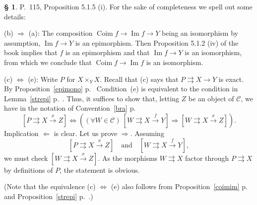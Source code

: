 \documentclass[12pt]{article}%
\theoremstyle{remark}
\theoremstyle{definition}
\newtheorem{s}[thm]{\S}%
\newcommand{\nn}{\noindent}
\newcommand{\C}{\mathcal C}
\newcommand{\parar}{\rightrightarrows}
\newcommand{\si}{\Leftarrow}
\newcommand{\ssi}{\Leftrightarrow}%
\newcommand{\then}{\Rightarrow}
\newcommand{\xr}{\xrightarrow}
\DeclareMathOperator{\Coim}{Coim}
\DeclareMathOperator{\Ima}{Im}
\begin{document}
\begin{s}\label{515i}
P.~115, Proposition 5.1.5 (i). For the sake of completeness we spell out some details:

\nn(b) $\then$ (a): The composition $\Coim f\to\Ima f\to Y$ being an isomorphism by assumption, $\Ima f\to Y$ is an epimorphism. Then Proposition 5.1.2 (iv) of the book implies that $f$ is an epimorphism and that $\Ima f\to Y$ is an isomorphism, from which we conclude that $\Coim f\to\Ima f$ is an isomorphism.

\nn(c) $\ssi$ (e): Write $P$ for $X\times_YX$. Recall that (c) says that $P\parar X\to Y$ is exact. By Proposition~\ref{epimono} p.~\pageref{epimono} Condition~(e) is equivalent to the condition in Lemma~\ref{strepi} p.~\pageref{strepi}. Thus, it suffices to show that, letting $Z$ be an object of $\C$, we have in the notation of Convention~\ref{bra} p.~\pageref{bra} 
$$
[P\parar X\xr xZ]\iff((\forall W\in\C)\ [W\parar X\xr fY]\then[W\parar X\xr xZ]).
$$ 
Implication $\si$ is clear. Let us prove $\then$. Assuming 
$$
[P\parar X\xr xZ]\quad\text{and}\quad[W\parar X\xr fY],
$$ 
we must check $[W\parar X\xr xZ]$. As the morphisms $W\parar X$ factor through $P\parar X$ by definitions of $P$, the statement is obvious. 

(Note that the equivalence (c) $\ssi$ (e) also follows from Proposition~\ref{coimim} p.~\pageref{coimim} and Proposition~\ref{strepi} p.~\pageref{strepi}.)
\end{s}

%
\end{document}
